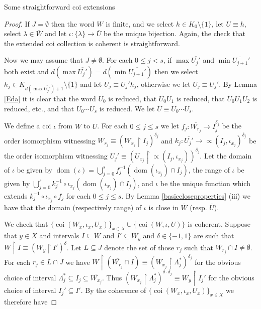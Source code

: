 \documentclass{amsart}
\theoremstyle{definition}\newtheorem{theorem}{Theorem}
\theoremstyle{definition}\newtheorem*{A}{Main Theorem}
\theoremstyle{definition}\newtheorem*{B}{Theorem \ref{elementaryequiv}}
\theoremstyle{definition}\newtheorem*{C}{Theorem \ref{continuous}}
\theoremstyle{definition}\newtheorem*{D}{Theorem \ref{bigisomorphism2}}
\theoremstyle{definition}\newtheorem{bigtheorem}{Main Theorem}
\numberwithin{theorem}{section}
\theoremstyle{definition}\newtheorem{corollary}[theorem]{Corollary}
\theoremstyle{definition}\newtheorem{proposition}[theorem]{Proposition}
\theoremstyle{definition}\newtheorem{definition}[theorem]{Definition}
\theoremstyle{definition}\newtheorem{question}[theorem]{Question}
\theoremstyle{definition}\newtheorem{example}[theorem]{Example}
\theoremstyle{definition}\newtheorem{remark}[theorem]{Remark}
\theoremstyle{definition}\newtheorem{note}[theorem]{Note}
\theoremstyle{definition}\newtheorem{lemma}[theorem]{Lemma}
\theoremstyle{definition}\newtheorem{fact}[theorem]{Fact}
\theoremstyle{definition}\newtheorem{define}[theorem]{Definition}
\theoremstyle{definition}\newtheorem{claim}[theorem]{Claim}
\theoremstyle{definition}\newtheorem{obs}[theorem]{Observation}
\theoremstyle{definition}\newtheorem{definitions}[theorem]{Definitions}
\newcommand{\coi}{\operatorname{coi}}
\newcommand{\dom}{\operatorname{dom}}
\begin{document}
\begin{section}{Some straightforward coi extensions}
\begin{proof}
If $J = \emptyset$ then the word $W$ is finite, and we select $h \in K_0\setminus \{1\}$, let $U \equiv h$, select $\lambda \in \overline{W}$ and let $\iota: \{\lambda\} \rightarrow \overline{U}$ be the unique bijection.  Again, the check that the extended coi collection is coherent is straightforward.

Now we may assume that $J \neq \emptyset$.  For each $0 \leq j < s$, if $\max\overline{U_j'}$ and $\min\overline{U_{j+1}}'$ both exist and $d(\max\overline{U_j'}) = d(\min\overline{U_{j+1}'})$ then we select $h_j \in K_{d(\max\overline{U_j'}) + 1} \setminus \{1\}$ and let $U_j \equiv U_j'h_j$, otherwise we let $U_j \equiv U_j'$.  By Lemma \ref{Eda} it is clear that the word $U_0$ is reduced, that $U_0U_1$ is reduced, that $U_0U_1U_2$ is reduced, etc., and that $U_0\cdots U_s$ is reduced.  We let $U \equiv U_0 \cdots U_s$.

We define a coi $\iota$ from $W$ to $U$.  For each $0 \leq j \leq s$ we let $f_j: \overline{W_{r_j}} \rightarrow I_j^{\delta_j}$ be the order isomorphism witnessing $W_{r_j} \equiv (W_{x_j} \upharpoonright I_j)^{\delta_j}$ and $k_j: \overline{U_j'} \rightarrow \varpropto(I_j, \iota_{x_j})^{\delta_j}$ be the order isomorphism witnessing $U_j' \equiv (U_{x_j} \upharpoonright \varpropto(I_j, \iota_{x_j}))^{\delta_j}$.  Let the domain of $\iota$ be given by $\dom(\iota) = \bigcup_{j=0}^s f_j^{-1}(\dom(\iota_{x_j}) \cap I_j)$, the range of $\iota$ be given by $\bigcup_{j=0}^s k_j^{-1} \circ \iota_{x_j}(\dom(\iota_{x_j}) \cap I_j)$, and $\iota$ be the unique function which extends $ k_j^{-1} \circ \iota_{x_j} \circ f_j$ for each $0 \leq j \leq s$.  By Lemma \ref{basiccloseproperties} (iii) we have that the domain (respectively range) of $\iota$ is close in $\overline{W}$ (resp. $\overline{U}$).


We check that $\{\coi(W_x, \iota_x, U_x)\}_{x\in X} \cup \{\coi(W, \iota, U)\}$ is coherent.  Suppose that $y\in X$ and intervals $I \subseteq \overline{W}$ and $I' \subseteq \overline{W_y}$ and $\delta \in \{-1, 1\}$ are such that $W \upharpoonright I  \equiv (W_y \upharpoonright I')^{\delta}$.  Let $L \subseteq J$ denote the set of those $r_j$ such that $\overline{W_{r_j}} \cap I \neq \emptyset$.  For each $r_j \in L \cap J$ we have $W\upharpoonright (\overline{W_{r_j}} \cap I) \equiv (W_{x_j}\upharpoonright \Lambda_j^*)^{\delta_j}$ for the obvious choice of interval $\Lambda_j^* \subseteq I_j \subseteq \overline{W_{x_j}}$.  Thus $(W_{x_j}\upharpoonright \Lambda_j^*)^{\delta \cdot \delta_j} \equiv W_y \upharpoonright I_j'$ for the obvious choice of interval $I_j' \subseteq I'$.  By the coherence of $\{\coi(W_x, \iota_x, U_x)\}_{x\in X}$ we therefore have


\end{proof}
\end{section}
\end{document}

